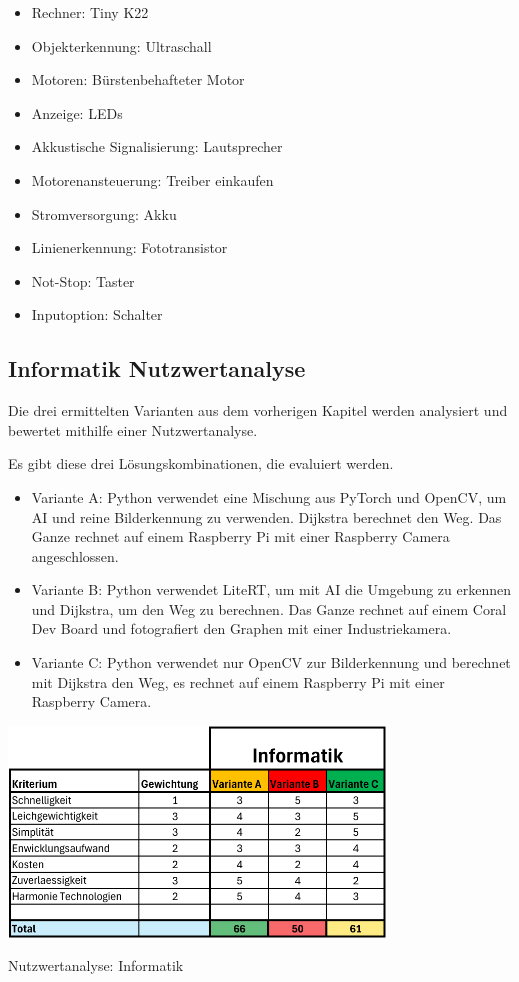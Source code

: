 \begin{itemize}
    \item Rechner: Tiny K22
    \item Objekterkennung: Ultraschall
    \item Motoren: Bürstenbehafteter Motor
    \item Anzeige: LEDs 
    \item Akkustische Signalisierung: Lautsprecher
    \item Motorenansteuerung: Treiber einkaufen
    \item Stromversorgung: Akku
    \item Linienerkennung: Fototransistor
    \item Not-Stop: Taster
    \item Inputoption: Schalter
\end{itemize}

\subsection{Informatik Nutzwertanalyse}

Die drei ermittelten Varianten aus dem vorherigen Kapitel werden analysiert und bewertet mithilfe einer Nutzwertanalyse.

Es gibt diese drei Lösungskombinationen, die evaluiert werden.

\begin{itemize}
     \item Variante A: Python verwendet eine Mischung aus PyTorch und OpenCV, um AI und reine Bilderkennung zu verwenden. Dijkstra berechnet den Weg. Das Ganze rechnet auf einem Raspberry Pi mit einer Raspberry Camera angeschlossen.
    \item  Variante B: Python verwendet LiteRT, um mit AI die Umgebung zu erkennen und Dijkstra, um den Weg zu berechnen. Das Ganze rechnet auf einem Coral Dev Board und fotografiert den Graphen mit einer Industriekamera.
    \item Variante C: Python verwendet nur OpenCV zur Bilderkennung und berechnet mit Dijkstra den Weg, es rechnet auf einem Raspberry Pi mit einer Raspberry Camera.
\end{itemize}

\begin{table}[H]
\centering
\includegraphics[width=0.75\textwidth]{assets/Nutzwertanalyse-I.pdf}
\caption{Nutzwertanalyse: Informatik}
\label{table:nutzwert-informatik}
\end{table}

